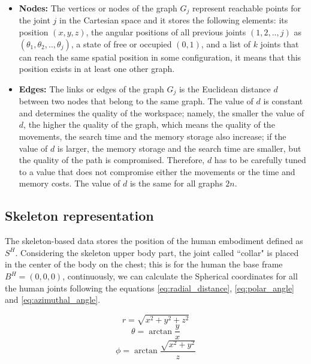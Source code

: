 \documentclass[thesis]{mas_proposal}
\begin{document}
	\begin{itemize}
		
		\item \textbf{Nodes:} The vertices or nodes of the graph $G_j$ represent reachable points for the joint $j$ in the Cartesian space and it stores the following elements: its position $(x, y, z)$, the angular positions of all previous joints $(1,2,..,j)$ as $(\theta_1, \theta_2,..,\theta_j)$, a state of free or occupied $(0, 1)$, and a list of $k$ joints that can reach the same spatial position in some configuration, it means that this position exists in at least one other graph. 	
		
		\item \textbf{Edges:} The links or edges of the graph $G_j$ is the Euclidean distance $d$ between two nodes that belong to the same graph. The value of $d$ is constant and determines the quality of the workspace; namely, the smaller the value of $d$, the higher the quality of the graph, which means the quality of the movements, the search time and the memory storage also increase; if the value of $d$ is larger, the memory storage and the search time are smaller, but the quality of the path is compromised. Therefore, $d$ has to be carefully tuned to a value that does not compromise either the movements or the time and memory costs. The value of $d$ is the same for all graphs $2n$.
		
	\end{itemize}  
  
   	\subsection{Skeleton representation}
   		The skeleton-based data stores the position of the human embodiment defined as $S^H$. Considering the skeleton upper body part, the joint called ``collar" is placed in the center of the body on the chest; this is for the human the base frame $B^H = (0, 0, 0)$, continuously, we can calculate the Spherical coordinates for all the human joints following the equations \ref{eq:radial_distance}, \ref{eq:polar_angle} and \ref{eq:azimuthal_angle}.
   	
	   	\begin{equation}
	   	r = \sqrt{x^2 + y^2 + z^2}
	   	\label{eq:radial_distance}
	   	\end{equation}
	   	\begin{equation}
	   	\theta = \arctan \frac{y}{x}
	   	\label{eq:polar_angle}
	   	\end{equation}
	   	\begin{equation}
	   	\phi = \arctan \frac{\sqrt{x^2 + y^2}}{z}
	   	\label{eq:azimuthal_angle}
	   	\end{equation}
	   	
\end{document}
